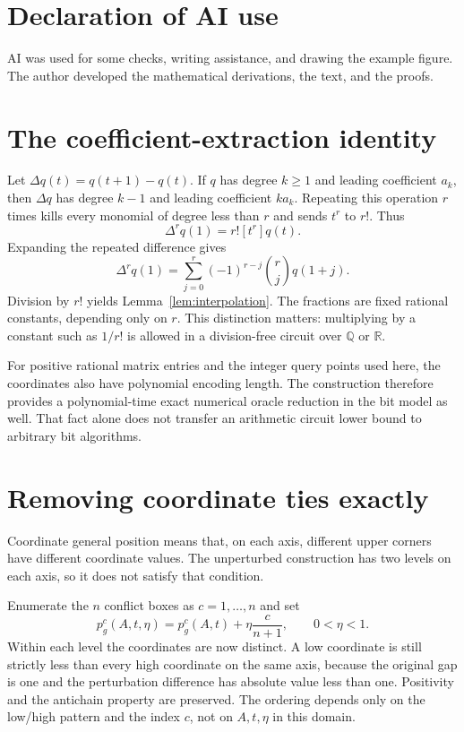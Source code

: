 \documentclass[12pt,a4paper]{article}
\theoremstyle{definition}
\theoremstyle{remark}
\newcommand{\R}{\mathbb R}
\newcommand{\Q}{\mathbb Q}
\begin{document}
\section*{Declaration of AI use}

AI was used for some checks, writing assistance, and drawing the example
figure. The author developed the mathematical derivations, the text,
and the proofs.

\appendix
\section{The coefficient-extraction identity}
\label{app:interpolation}

Let $\Delta q(t)=q(t+1)-q(t)$. If $q$ has degree $k\ge1$ and leading
coefficient $a_k$, then $\Delta q$ has degree $k-1$ and leading
coefficient $ka_k$. Repeating this operation $r$ times kills every
monomial of degree less than $r$ and sends $t^r$ to $r!$. Thus
\[
 \Delta^r q(1)=r![t^r]q(t).
\]
Expanding the repeated difference gives
\[
 \Delta^r q(1)=\sum_{j=0}^r(-1)^{r-j}\binom rj q(1+j).
\]
Division by $r!$ yields Lemma~\ref{lem:interpolation}. The fractions
are fixed rational constants, depending only on $r$. This distinction
matters: multiplying by a constant such as $1/r!$ is allowed in a
division-free circuit over $\Q$ or $\R$.

For positive rational matrix entries and the integer query points used here,
the coordinates also have polynomial encoding length. The construction
therefore provides a polynomial-time exact numerical oracle reduction
in the bit model as well. That fact alone does not transfer an
arithmetic circuit lower bound to arbitrary bit algorithms.

\section{Removing coordinate ties exactly}
\label{app:general-position}

Coordinate general position means that, on each axis, different upper
corners have different coordinate values. The unperturbed construction
has two levels on each axis, so it does not satisfy that condition.

Enumerate the $n$ conflict boxes as $c=1,\ldots,n$ and set
\begin{equation}
 p^c_g(A,t,\eta)=p^c_g(A,t)+\eta\frac{c}{n+1},
 \qquad 0<\eta<1.
 \label{eq:perturbation}
\end{equation}
Within each level the coordinates are now distinct. A low coordinate
is still strictly less than every high coordinate on the same axis,
because the original gap is one and the perturbation difference has
absolute value less than one. Positivity and the antichain property
are preserved. The ordering depends only on the low/high pattern and
the index $c$, not on $A,t,\eta$ in this domain.
\end{document}
